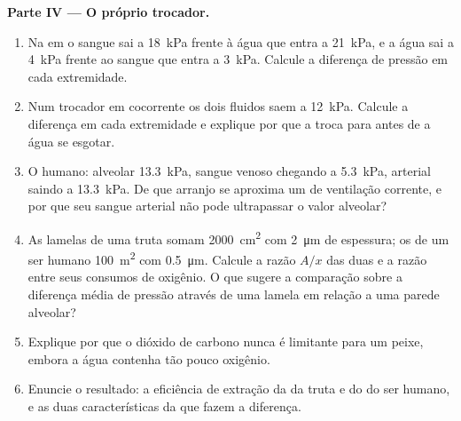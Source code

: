\begin{problem}
\medskip
\noindent\textbf{Parte IV --- O próprio trocador.}
\begin{enumerate}[resume]
  \item Na  em  o sangue sai a \qty{18}{kPa}
        frente à água que entra a \qty{21}{kPa}, e a água sai a
        \qty{4}{kPa} frente ao sangue que entra a \qty{3}{kPa}.
        Calcule a diferença de pressão em cada extremidade.
  \item Num trocador em cocorrente os dois fluidos saem a
        \qty{12}{kPa}. Calcule a diferença em cada extremidade e
        explique por que a troca para antes de a água se esgotar.
  \item O  humano: alveolar \qty{13.3}{kPa}, sangue venoso
        chegando a \qty{5.3}{kPa}, arterial saindo a \qty{13.3}{kPa}.
        De que arranjo se aproxima um  de ventilação corrente, e
        por que seu sangue arterial não pode ultrapassar o valor
        alveolar?
  \item As lamelas de uma truta somam \qty{2000}{cm^2} com
        \qty{2}{\micro m} de espessura; os  de um ser humano
        \qty{100}{m^2} com \qty{0.5}{\micro m}. Calcule a razão $A/x$
        das duas e a razão entre seus consumos de oxigênio. O que
        sugere a comparação sobre a diferença média de pressão através
        de uma lamela em relação a uma parede alveolar?
  \item Explique por que o dióxido de carbono nunca é limitante para
        um peixe, embora a água contenha tão pouco oxigênio.
  \item Enuncie o resultado: a eficiência de extração da  da
        truta e do  do ser humano, e as duas características da
         que fazem a diferença.
\end{enumerate}
\end{problem}
